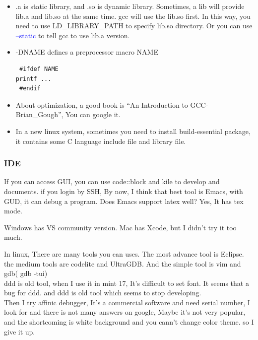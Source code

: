 \documentclass[a4paper,12pt,twoside]{book}
\newcommand{\op}[1]{\textcolor{blue}{-#1}}
\begin{document}
\begin{itemize}
    \item .a is static library, and .so is dynamic library. Sometimes, a lib will provide lib.a
        and lib.so at the same time. gcc will use the lib.so first. In this way, you need to use
        LD\_LIBRARY\_PATH to specify lib.so directory. Or you can use \op{-static} to tell
        gcc to use lib.a version.

    \item -DNAME defines a preprocessor macro NAME
\begin{verbatim}
 #ifdef NAME
printf ...
 #endif
\end{verbatim}

   \item About optimization, a good book is ``An Introduction to GCC-Brian\_Gough'', You can google it.

   \item In a new linux system, sometimes you need to install build-essential package,  it contains some C
       language include file and library file.

\end{itemize}



\subsubsection{IDE}
If you can access GUI, you can use code::block and kile to develop and documents. if
you login by SSH, By now, I think that best tool is Emacs, with GUD, it can debug a
program. Does Emacs support latex well? Yes, It has tex mode. \par

Windows has VS community version.  Mac has Xcode, but I didn't try it too much. 

In linux, There are many tools you can uses. The most advance tool is Eclipse. the medium tools are codelite and UltraGDB. And the simple tool is vim and gdb( gdb -tui) \\

ddd is old tool, when I use it in mint 17, It's difficult to set font.  It seems that a bug for ddd. and ddd is old tool which seems to stop developing.  \\

Then I try affinic debugger, It's a commercial software and need serial number, I look for and there is not many answers on google, Maybe it's not very popular,  and the shortcoming is white background and you cann't change color theme. so I give it up. \\
\end{document}
